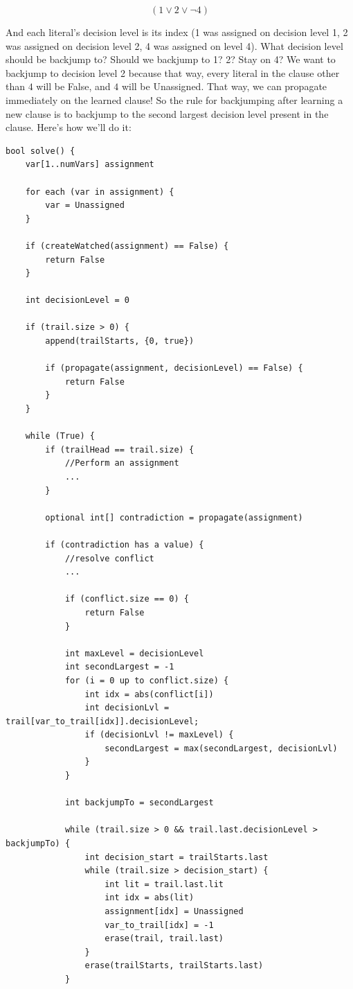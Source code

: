 \documentclass[../main.tex]{subfiles}
\begin{document}
$$ (1 \vee 2 \vee \neg 4) $$

And each literal's decision level is its index (1 was assigned on decision level 1, 
2 was assigned on decision level 2, 4 was assigned on level 4). What decision level 
should be backjump to? Should we backjump to 1? 2? Stay on 4? We want to backjump to 
decision level 2 because that way, every literal in the clause other than $4$ will 
be False, and $4$ will be Unassigned. That way, we can propagate immediately on the 
learned clause! So the rule for backjumping after learning a new clause is to backjump 
to the second largest decision level present in the clause. Here's how we'll do it:

\begin{lstlisting}
bool solve() {
    var[1..numVars] assignment

    for each (var in assignment) {
        var = Unassigned
    }

    if (createWatched(assignment) == False) {
        return False
    }

    int decisionLevel = 0

    if (trail.size > 0) {
        append(trailStarts, {0, true})

        if (propagate(assignment, decisionLevel) == False) {
            return False
        }
    }

    while (True) {
        if (trailHead == trail.size) {
            //Perform an assignment
            ...
        }

        optional int[] contradiction = propagate(assignment)

        if (contradiction has a value) {
            //resolve conflict
            ...

            if (conflict.size == 0) {
                return False
            }

            int maxLevel = decisionLevel
            int secondLargest = -1
            for (i = 0 up to conflict.size) {
                int idx = abs(conflict[i])
                int decisionLvl = trail[var_to_trail[idx]].decisionLevel;
                if (decisionLvl != maxLevel) {
                    secondLargest = max(secondLargest, decisionLvl)
                }
            }

            int backjumpTo = secondLargest

            while (trail.size > 0 && trail.last.decisionLevel > backjumpTo) {
                int decision_start = trailStarts.last
                while (trail.size > decision_start) {
                    int lit = trail.last.lit
                    int idx = abs(lit)
                    assignment[idx] = Unassigned
                    var_to_trail[idx] = -1
                    erase(trail, trail.last)
                }
                erase(trailStarts, trailStarts.last)
            }


\end{lstlisting}
\end{document}
